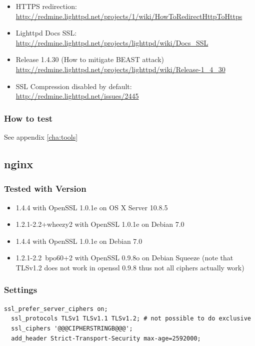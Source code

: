 \begin{itemize}
        \item HTTPS redirection: \url{http://redmine.lighttpd.net/projects/1/wiki/HowToRedirectHttpToHttps}
        \item Lighttpd Docs SSL: \url{http://redmine.lighttpd.net/projects/lighttpd/wiki/Docs\_SSL}
        \item Release 1.4.30 (How to mitigate BEAST attack) \url{http://redmine.lighttpd.net/projects/lighttpd/wiki/Release-1\_4\_30}
        \item SSL Compression disabled by default: \url{http://redmine.lighttpd.net/issues/2445}
\end{itemize}




\subsubsection{How to test} 
See appendix \ref{cha:tools}



\subsection{nginx}

\subsubsection{Tested with Version} 
\begin{itemize}
\item 1.4.4 with OpenSSL 1.0.1e on OS X Server 10.8.5
\item 1.2.1-2.2+wheezy2 with OpenSSL 1.0.1e on Debian 7.0
\item 1.4.4 with OpenSSL 1.0.1e on Debian 7.0
\item 1.2.1-2.2~bpo60+2 with OpenSSL 0.9.8o on Debian Squeeze (note that TLSv1.2 does not work in openssl 0.9.8 thus not all ciphers actually work)
\end{itemize}


\subsubsection{Settings}

\begin{lstlisting}[breaklines]
  ssl_prefer_server_ciphers on;
  ssl_protocols TLSv1 TLSv1.1 TLSv1.2; # not possible to do exclusive
  ssl_ciphers '@@@CIPHERSTRINGB@@@';
  add_header Strict-Transport-Security max-age=2592000;
\end{lstlisting}

